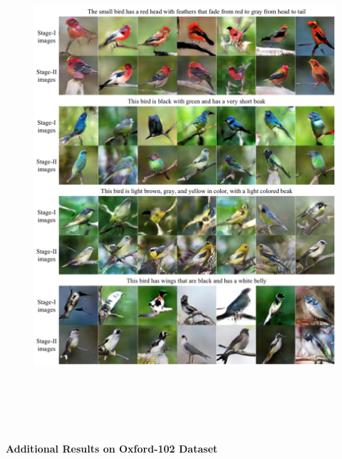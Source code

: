 \documentclass[a4paper,12pt,oneside]{article}
\begin{document}
  \begin{figure}[H]
    \centering
    \includegraphics[height=18cm,width=15cm]{Figure10.png}
    \end{figure}
\newpage
    \textbf{Additional Results on Oxford-102 Dataset}
\end{document}
